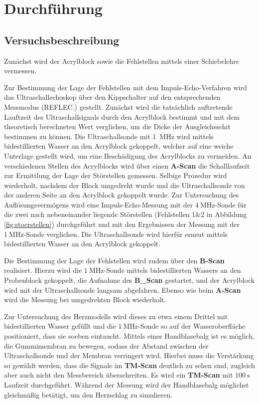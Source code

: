 \section{Durchführung}
\label{sec:Durchführung}



\subsection{Versuchsbeschreibung}
\label{sec:Versuchsbeschreibung}
Zunächst wird der Acrylblock sowie die Fehlstellen mittels einer Schiebelehre vermessen.

Zur Bestimmung der Lage der Fehlstellen mit dem Impuls-Echo-Verfahren wird das Ultraschallechoskop über den Kippschalter auf den entsprechenden Messmodus (REFLEC.) gestellt.
Zunächst wird die tatsächlich auftretende Lauftzeit des Ultraschallsignals durch den Acrylblock bestimmt und mit dem theoretisch berechneten Wert verglichen, um die Dicke der Ausgleichsschit bestimmen zu können.
Die Ultraschallsonde mit \SI{1}{\mega\Hz} wird mittels bidestillierten Wasser an den Acrylblock gekoppelt, welcher auf eine weiche Unterlage gestellt wird, um eine Beschädigung des Acrylblocks zu vermeiden.
An verschiedenen Stellen des Acrylblocks wird über einen \textbf{A-Scan} die Schalllaufzeit zur Ermittlung der Lage der Störstellen gemessen. Selbige Prozedur wird wiederholt, nachdem der Block umgedreht wurde und die Ultraschallsonde von der anderen Seite an den Acrylblock gekoppelt wurde.
Zur Untersuchung des Auflösungsvermögens wird eine Impuls-Echo-Messung mit der $\SI{4}{\mega\Hz}$-Sonde für die zwei nach nebeneinander liegende Störstellen (Fehlstellen 1\&2 in Abbildung \ref{fig:stoerstellen}) durchgeführt und mit den Ergebnissen der Messung mit der $\SI{1}{\mega\Hz}$-Sonde verglichen.
Die Ultraschallsonde wird hierfür erneut mittels bidestillierten Wasser an den Acrylblock gekoppelt.

Die Bestimmung der Lage der Fehlstellen wird zudem über den \textbf{B-Scan} realisiert. Hierzu wird die $\SI{1}{\mega\Hz}$-Sonde mittels bidestillierten Wassers an den Probenblock gekoppelt, die Aufnahme des \textbf{B_Scan} gestartet, und der Acrylblock wird mit der Ultraschallsonde langsam abgefahren.
Ebenso wie beim \textbf{A-Scan} wird die Messung bei umgedrehten Block wiederholt.

Zur Untersuchung des Herzmodells wird dieses zu etwa einem Drittel mit bidestillierten Wasser gefüllt und die $\SI{1}{\mega\Hz}$-Sonde so auf der Wasseroberfläche positioniert, dass sie soeben eintaucht. Mittels eines Handblasebalg ist es möglich, die Gummimembran zu bewegen, sodass der Abstand zwischen der Ultraschallsonde und der Membran verringert wird. Hierbei muss die Verstärkung so gewählt werden, dass die Signale im \textbf{TM-Scan} deutlich zu sehen sind, zugleich aber auch nicht den Messbereich überschreiten.
Es wird ein \textbf{TM-Scan} mit $\SI{100}{\second}$ Laufzeit durchgeführt. Während der Messung wird der Handblasebalg möglichst gleichmäßig betätigt, um den Herzschlag zu simulieren.
